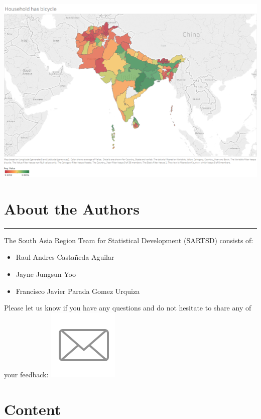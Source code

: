 \documentclass[13 pt,]{book}
\begin{document}
\href{https://tab.worldbank.org/\#/site/WBG/views/SAR_MNA_Subnational/Subnational}{\includegraphics{figures/bicycle.png}}

\chapter*{About the Authors}\label{about-the-authors}

\begin{center}\rule{0.5\linewidth}{\linethickness}\end{center}

The South Asia Region Team for Statistical Development (SARTSD) consists
of:

\begin{itemize}
\item
  Raul Andres Castañeda Aguilar
\item
  Jayne Jungsun Yoo
\item
  Francisco Javier Parada Gomez Urquiza
\end{itemize}

Please let us know if you have any questions and do not hesitate to
share any of your feedback:
\href{mailto:fparadagomezurqu@worldbank.org}{\includegraphics{figures/mail.png}}

\chapter*{Content}\label{content}
\end{document}
